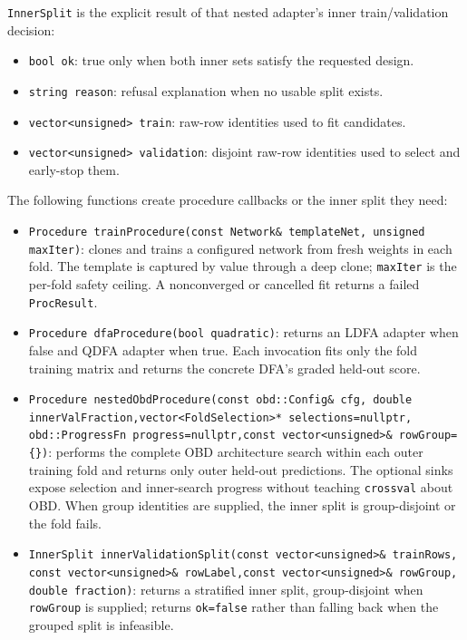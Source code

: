 \texttt{InnerSplit} is the explicit result of that nested adapter's inner
train/validation decision:

\begin{itemize}
\item \texttt{bool ok}: true only when both inner sets satisfy the requested design.
\item \texttt{string reason}: refusal explanation when no usable split exists.
\item \texttt{vector<unsigned> train}: raw-row identities used to fit candidates.
\item \texttt{vector<unsigned> validation}: disjoint raw-row identities used to
      select and early-stop them.
\end{itemize}

The following functions create procedure callbacks or the inner split they need:

\begin{itemize}
\item \texttt{Procedure trainProcedure(const Network\& templateNet,
      unsigned maxIter)}: clones and trains a configured network from fresh
      weights in each fold.  The template is captured by value through a deep
      clone; \texttt{maxIter} is the per-fold safety ceiling.  A nonconverged or
      cancelled fit returns a failed \texttt{ProcResult}.
\item \texttt{Procedure dfaProcedure(bool quadratic)}: returns an LDFA adapter
      when false and QDFA adapter when true.  Each invocation fits only the
      fold training matrix and returns the concrete DFA's graded held-out score.
\item \texttt{Procedure nestedObdProcedure(const obd::Config\& cfg,
      double innerValFraction,vector<FoldSelection>* selections=nullptr,
      obd::ProgressFn progress=nullptr,const vector<unsigned>\& rowGroup=\{\})}:
      performs the complete OBD architecture
      search within each outer training fold and returns only outer held-out
      predictions.  The optional sinks expose selection and inner-search
      progress without teaching \texttt{crossval} about OBD.  When group
      identities are supplied, the inner split is group-disjoint or the fold fails.
\item \texttt{InnerSplit innerValidationSplit(const vector<unsigned>\& trainRows,
      const vector<unsigned>\& rowLabel,const vector<unsigned>\& rowGroup,
      double fraction)}: returns a stratified inner split, group-disjoint when
      \texttt{rowGroup} is supplied; returns \texttt{ok=false} rather than
      falling back when the grouped split is infeasible.
\end{itemize}

